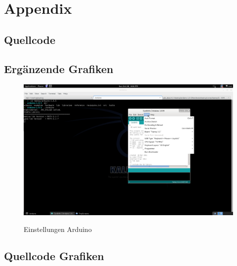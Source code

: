 
\appendix
\chapter{Appendix}
\section{Quellcode}


\lstset{language=C}


\newpage
\section{Ergänzende Grafiken}

\begin{figure}[htbp]

\centering
\includegraphics[width=\textwidth]{bilder/EinstellungenArduino.png}
\label{fig:EinstellungenArduino}
\caption{Einstellungen Arduino}
\end{figure}


\section{Quellcode Grafiken}
\lstset{language=tikz}



